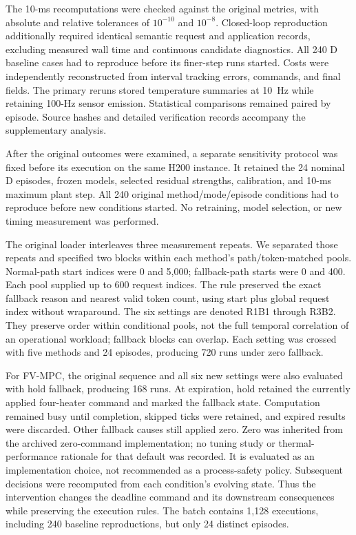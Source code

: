 The 10-ms recomputations were checked against the original metrics, with absolute and relative tolerances of $10^{-10}$ and $10^{-8}$. Closed-loop reproduction additionally required identical semantic request and application records, excluding measured wall time and continuous candidate diagnostics. All 240 D baseline cases had to reproduce before its finer-step runs started. Costs were independently reconstructed from interval tracking errors, commands, and final fields. The primary reruns stored temperature summaries at 10~Hz while retaining 100-Hz sensor emission. Statistical comparisons remained paired by episode. Source hashes and detailed verification records accompany the supplementary analysis.




\label{sec:replay_protocol}

After the original outcomes were examined, a separate sensitivity protocol was fixed before its execution on the same H200 instance. It retained the 24 nominal D episodes, frozen models, selected residual strengths, calibration, and 10-ms maximum plant step. All 240 original method/mode/episode conditions had to reproduce before new conditions started. No retraining, model selection, or new timing measurement was performed.

The original loader interleaves three measurement repeats. We separated those repeats and specified two blocks within each method's path/token-matched pools. Normal-path start indices were 0 and 5,000; fallback-path starts were 0 and 400. Each pool supplied up to 600 request indices. The rule preserved the exact fallback reason and nearest valid token count, using start plus global request index without wraparound. The six settings are denoted R1B1 through R3B2. They preserve order within conditional pools, not the full temporal correlation of an operational workload; fallback blocks can overlap. Each setting was crossed with five methods and 24 episodes, producing 720 runs under zero fallback.

For FV-MPC, the original sequence and all six new settings were also evaluated with hold fallback, producing 168 runs. At expiration, hold retained the currently applied four-heater command and marked the fallback state. Computation remained busy until completion, skipped ticks were retained, and expired results were discarded. Other fallback causes still applied zero. Zero was inherited from the archived zero-command implementation; no tuning study or thermal-performance rationale for that default was recorded. It is evaluated as an implementation choice, not recommended as a process-safety policy. Subsequent decisions were recomputed from each condition's evolving state. Thus the intervention changes the deadline command and its downstream consequences while preserving the execution rules. The batch contains 1,128 executions, including 240 baseline reproductions, but only 24 distinct episodes.

